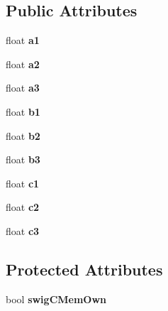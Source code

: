 \subsection*{Public Attributes}
\begin{DoxyCompactItemize}
\item 
\hypertarget{structai_matrix3x3_a6884258a2f50758ed8b554b531186917}{float {\bfseries a1}}\label{structai_matrix3x3_a6884258a2f50758ed8b554b531186917}

\item 
\hypertarget{structai_matrix3x3_a4c74733870193040ba4953fb673e77df}{float {\bfseries a2}}\label{structai_matrix3x3_a4c74733870193040ba4953fb673e77df}

\item 
\hypertarget{structai_matrix3x3_a851d391df32a39e1ced1a9a286b38cf4}{float {\bfseries a3}}\label{structai_matrix3x3_a851d391df32a39e1ced1a9a286b38cf4}

\item 
\hypertarget{structai_matrix3x3_a9eeba340d3502017caad70416f03863a}{float {\bfseries b1}}\label{structai_matrix3x3_a9eeba340d3502017caad70416f03863a}

\item 
\hypertarget{structai_matrix3x3_a9f5e25b60bbd7bdf8f0a19cd82cc6b15}{float {\bfseries b2}}\label{structai_matrix3x3_a9f5e25b60bbd7bdf8f0a19cd82cc6b15}

\item 
\hypertarget{structai_matrix3x3_a21aa4345fe6ce2774db94d118c536d02}{float {\bfseries b3}}\label{structai_matrix3x3_a21aa4345fe6ce2774db94d118c536d02}

\item 
\hypertarget{structai_matrix3x3_ae62a2877076cbee151e89cb34567e3ca}{float {\bfseries c1}}\label{structai_matrix3x3_ae62a2877076cbee151e89cb34567e3ca}

\item 
\hypertarget{structai_matrix3x3_a8e0d85d5c46eb4f4478f1fe159be4320}{float {\bfseries c2}}\label{structai_matrix3x3_a8e0d85d5c46eb4f4478f1fe159be4320}

\item 
\hypertarget{structai_matrix3x3_aa7eef894dec22db1011092410b24f19b}{float {\bfseries c3}}\label{structai_matrix3x3_aa7eef894dec22db1011092410b24f19b}

\end{DoxyCompactItemize}
\subsection*{Protected Attributes}
\begin{DoxyCompactItemize}
\item 
\hypertarget{structai_matrix3x3_a4f78a22f4fa7b1a251b6c678acbfc289}{bool {\bfseries swig\+C\+Mem\+Own}}\label{structai_matrix3x3_a4f78a22f4fa7b1a251b6c678acbfc289}

\end{DoxyCompactItemize}


